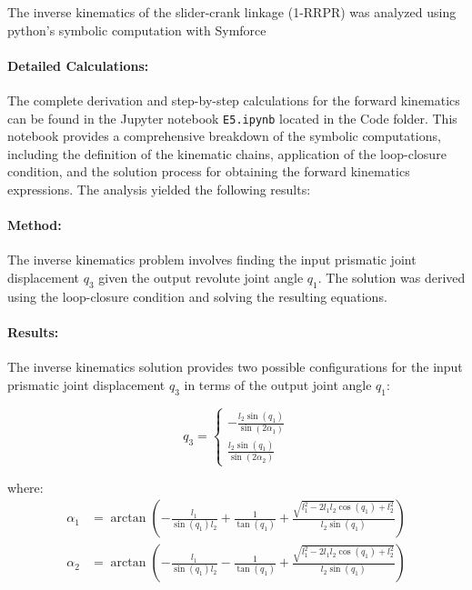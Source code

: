 \begin{solution}
%    
    
The inverse kinematics of the slider-crank linkage (1-RRPR) was analyzed using python's symbolic computation with Symforce \cite{martiros2022symforce} \paragraph{Detailed Calculations:} The complete derivation and step-by-step calculations for the forward kinematics can be found in the Jupyter notebook \texttt{E5.ipynb} located in the Code folder. This notebook provides a comprehensive breakdown of the symbolic computations, including the definition of the kinematic chains, application of the loop-closure condition, and the solution process for obtaining the forward kinematics expressions. The analysis yielded the following results:

\paragraph{Method:} The inverse kinematics problem involves finding the input prismatic joint displacement $q_3$ given the output revolute joint angle $q_1$. The solution was derived using the loop-closure condition and solving the resulting equations.

\paragraph{Results:} The inverse kinematics solution provides two possible configurations for the input prismatic joint displacement $q_3$ in terms of the output joint angle $q_1$:

\begin{equation}
q_3 = \begin{cases}
    -\frac{l_2 \sin(q_1)}{\sin(2\alpha_1)} \\[10pt]
    \frac{l_2 \sin(q_1)}{\sin(2\alpha_2)}
\end{cases}
\end{equation}

where:
\begin{align*}
\alpha_1 &= \arctan\left(-\frac{l_1} {\sin(q_1)l_2} + \frac{1}{\tan(q_1)} + \frac{\sqrt{l_1^2 - 2l_1l_2\cos(q_1) + l_2^2}}{l_2 \sin(q_1)}\right) \\[10pt]
\alpha_2 &= \arctan\left(-\frac{l_1} {\sin(q_1)l_2} - \frac{1}{\tan(q_1)} + \frac{\sqrt{l_1^2 - 2l_1l_2\cos(q_1) + l_2^2}}{l_2 \sin(q_1)}\right)
\end{align*}


\end{solution}
